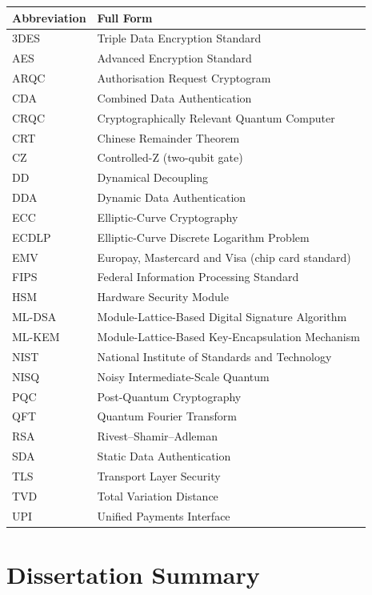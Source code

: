 \documentclass[12pt,oneside]{report}
\begin{document}
\begin{center}\small\begin{tabularx}{\textwidth}{|W|W|}\hline
Abbreviation & Full Form \\\hline
3DES & Triple Data Encryption Standard \\\hline
AES & Advanced Encryption Standard \\\hline
ARQC & Authorisation Request Cryptogram \\\hline
CDA & Combined Data Authentication \\\hline
CRQC & Cryptographically Relevant Quantum Computer \\\hline
CRT & Chinese Remainder Theorem \\\hline
CZ & Controlled-Z (two-qubit gate) \\\hline
DD & Dynamical Decoupling \\\hline
DDA & Dynamic Data Authentication \\\hline
ECC & Elliptic-Curve Cryptography \\\hline
ECDLP & Elliptic-Curve Discrete Logarithm Problem \\\hline
EMV & Europay, Mastercard and Visa (chip card standard) \\\hline
FIPS & Federal Information Processing Standard \\\hline
HSM & Hardware Security Module \\\hline
ML-DSA & Module-Lattice-Based Digital Signature Algorithm \\\hline
ML-KEM & Module-Lattice-Based Key-Encapsulation Mechanism \\\hline
NIST & National Institute of Standards and Technology \\\hline
NISQ & Noisy Intermediate-Scale Quantum \\\hline
PQC & Post-Quantum Cryptography \\\hline
QFT & Quantum Fourier Transform \\\hline
RSA & Rivest–Shamir–Adleman \\\hline
SDA & Static Data Authentication \\\hline
TLS & Transport Layer Security \\\hline
TVD & Total Variation Distance \\\hline
UPI & Unified Payments Interface \\\hline\end{tabularx}\end{center}

\newpage
\section*{Dissertation Summary}
\end{document}
